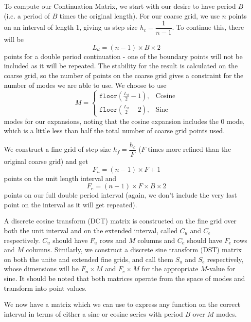 \documentclass[11pt]{amsart}
\begin{document}
To compute our Continuation Matrix, we start with our desire to have period $B$ (i.e. a period of $B$ times the original length). For our coarse grid, we use $n$ points on an interval of length 1, giving us step size $h_c=\dfrac{1}{n-1}$.  To continue this,  there will be  
\begin{equation}
L_d=(n-1)\times B \times 2
\end{equation}
 points for a double period continuation - one of the boundary points will not be included as it will be repeated.  The stability for the result is calculated on the coarse grid, so the number of points on the coarse grid gives a constraint for the number of modes we are able to use.  We choose to use 
 \begin{equation}
 M=\begin{cases}
 \texttt{floor}(\frac{L_d}{2}-1), & \text{Cosine} \\
 \texttt{floor}(\frac{L_d}{2}-2), & \text{Sine}
 \end{cases}
 \end{equation}
 modes for our expansions, noting that the cosine expansion includes the 0 mode, which is a little less than half the total number of coarse grid points used. 

We construct a fine grid of step size $h_f=\dfrac{h_c}{F}$ ($F$ times more refined than the original coarse grid) and get 
\begin{equation}
F_u=(n-1)\times F + 1
\end{equation} points on the unit length interval and 
\begin{equation}
F_e=(n-1)\times F \times B \times 2
\end{equation} points on our full double period interval (again, we don't include the very last point on the interval as it will get repeated). 

A discrete cosine transform (DCT) matrix is constructed on the fine grid over both the unit interval and on the extended interval, called $C_u$ and $C_e$ respectively.  $C_u$ should have $F_u$ rows and $M$ columns and $C_e$ should have $F_e$ rows and $M$ columns.  Similarly, we construct a discrete sine transform (DST) matrix on both the unite and extended fine grids, and call them $S_u$ and $S_e$ respectively, whose dimensions will be $F_u \times M$ and $F_e \times M$ for the appropriate $M$-value for sine.  It should be noted that both matrices operate from the space of modes and transform into point values.   

We now have a matrix  which we can use to express any function on the correct interval in terms of either a sine or cosine series with period $B$ over $M$ modes.  
\end{document}
